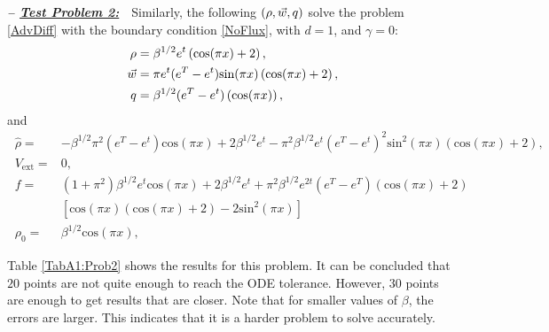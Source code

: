 \textbf{\emph{-- \underline{Test Problem 2:}}}~~Similarly, the following $(\rho,\vec{w},q)$ solve the problem \eqref{AdvDiff} with the boundary condition \eqref{NoFlux}, with $d=1$, and $\gamma = 0$:
\begin{align*}
\ \rho={}&\beta^{1/2}e^{t}\left(\text{cos}(\pi{}x)+2\right), \\
\ \vec{w}={}&\pi{}e^{t}(e^{T}-e^{t})\text{sin}(\pi{}x)\left(\text{cos}(\pi{}x)+2\right), \\
\ \adj={}&\beta^{1/2}(e^{T}-e^{t})\left(\text{cos}(\pi{}x)\right),
\end{align*}
and
\begin{align*}
\ \widehat{\rho}={}&-\beta^{1/2}\pi^2{}\left(e^{T}-e^{t}\right)\text{cos}(\pi{}x) +2\beta^{1/2}e^{t} -\pi^{2}\beta^{1/2}e^{t}(e^{T}-e^{t})^2\text{sin}^2(\pi{}x)\left(\text{cos}(\pi{}x)+2 \right), \\
\ V_{\text{ext}}={}&0, \\
\ f={}&(1+\pi^2)\beta^{1/2}e^{t}\text{cos}(\pi{}x) + 2\beta^{1/2}e^{t} +\pi^2\beta^{1/2}e^{2t}(e^{T}-e^{T})\left(\text{cos}(\pi{}x) +2\right)\\
&\left[\text{cos}(\pi{}x)\left(\text{cos}(\pi{}x) +2\right)-2\text{sin}^2(\pi{}x)\right] \\
\ \rho_{0}={}&\beta^{1/2}\text{cos}(\pi{}x),
\end{align*}

Table \ref{TabA1:Prob2} shows the results for this problem. It can be concluded that $20$ points are not quite enough to reach the ODE tolerance. However, $30$ points are enough to get results that are closer. Note that for smaller values of $\beta$, the errors are larger. This indicates that it is a harder problem to solve accurately. 

